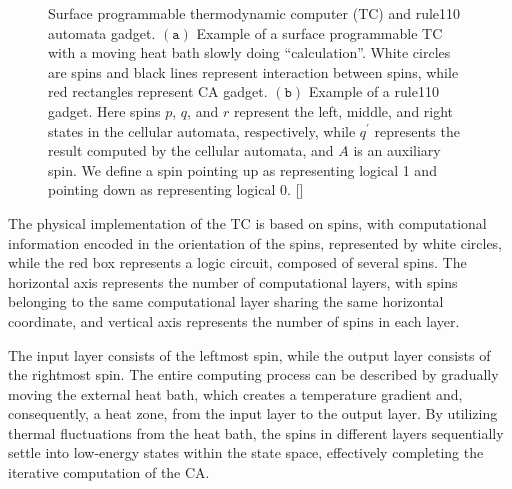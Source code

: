 \documentclass[twocolumn,superscriptaddress,english,showpacs,longbibliography]{revtex4-2}
\newcommand{\jinguo}[1]{[{\color{blue}{JGL: #1}}]}
\begin{document}
\begin{figure}[h]
    \caption{Surface programmable thermodynamic computer (TC) and rule110 automata gadget. $\mathtt{(a)}$ Example of a surface programmable TC with a moving heat bath slowly doing ``calculation''. White circles are spins and black lines represent interaction between spins, while red rectangles represent CA gadget. $\mathtt{(b)}$ Example of a rule110 gadget. Here spins $p$, $q$, and $r$ represent the left, middle, and right states in the cellular automata, respectively, while $q^\prime$ represents the result computed by the cellular automata, and $A$ is an auxiliary spin. We define a spin pointing up as representing logical 1 and pointing down as representing logical 0. \jinguo{why capital A? q' not clear.}}
    \label{Surface-programmable-thermodynamic computer}
\end{figure}

The physical implementation of the TC is based on spins, with computational information encoded in the orientation of the spins, represented by white circles, while the red box represents a logic circuit, composed of several spins. The horizontal axis represents the number of computational layers, with spins belonging to the same computational layer sharing the same horizontal coordinate, and vertical axis represents the number of spins in each layer. 

The input layer consists of the leftmost spin, while the output layer consists of the rightmost spin. The entire computing process can be described by gradually moving the external heat bath, which creates a temperature gradient and, consequently, a heat zone, from the input layer to the output layer. By utilizing thermal fluctuations from the heat bath, the spins in different layers sequentially settle into low-energy states within the state space, effectively completing the iterative computation of the CA.
\end{document}
